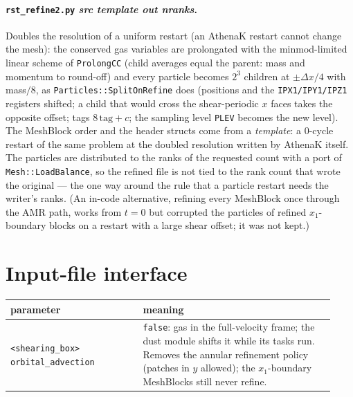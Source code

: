 \documentclass[11pt]{article}
\newcommand{\code}[1]{\texttt{#1}}
\newcommand{\file}[1]{\texttt{\small #1}}
\newcommand{\fn}[1]{\texttt{\small #1}}
\begin{document}
\paragraph{\file{rst\_refine2.py} \textit{src template out nranks}.}  Doubles the
resolution of a uniform restart (an AthenaK restart cannot change the mesh): the
conserved gas variables are prolongated with the minmod-limited linear scheme of
\fn{ProlongCC} (child averages equal the parent: mass and momentum to round-off) and
every particle becomes $2^3$ children at $\pm\Delta x/4$ with mass$/8$, as
\fn{Particles::SplitOnRefine} does (positions and the \code{IPX1/IPY1/IPZ1} registers
shifted; a child that would cross the shear-periodic $x$ faces takes the opposite
offset; tags $8\,\mathrm{tag}+c$; the sampling level \code{PLEV} becomes the new level).
The MeshBlock order and the header structs come from a \emph{template}: a 0-cycle restart
of the same problem at the doubled resolution written by AthenaK itself.  The particles
are distributed to the ranks of the requested count with a port of
\fn{Mesh::LoadBalance}, so the refined file is not tied to the rank count that wrote the
original --- the one way around the rule that a particle restart needs the writer's
ranks.  (An in-code alternative, refining every MeshBlock once through the AMR path, works
from $t=0$ but corrupted the particles of refined $x_1$-boundary blocks on a restart with
a large shear offset; it was not kept.)

\section{Input-file interface}

\begin{center}\small
\begin{tabular}{p{0.38\linewidth}p{0.55\linewidth}}
\toprule
parameter & meaning \\
\midrule
\code{<shearing\_box> orbital\_advection} & \code{false}: gas in the full-velocity frame;
  the dust module shifts it while its tasks run.  Removes the annular refinement policy
  (patches in $y$ allowed); the $x_1$-boundary MeshBlocks still never refine. \\
\bottomrule
\end{tabular}
\end{center}
\end{document}
